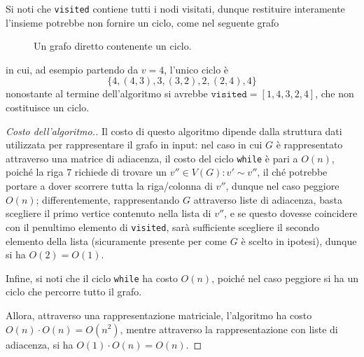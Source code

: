 \documentclass[a4paper, 12pt]{report}
\begin{document}
    \begin{framedobs}{}
        Si noti che \texttt{visited} contiene tutti i nodi visitati, dunque restituire interamente l'insieme potrebbe non fornire un ciclo, come nel seguente grafo
        \begin{figure}[H]
            \centering
            \caption{Un grafo diretto contenente un ciclo.}
        \end{figure}

        in cui, ad esempio partendo da $v= 4$, l'unico ciclo è $$\{4, (4, 3), 3, (3, 2), 2, (2, 4), 4\}$$ nonostante al termine dell'algoritmo si avrebbe $\texttt{visited}=[1, 4, 3, 2, 4]$, che non costituisce un ciclo.

    \end{framedobs}

    \begin{proof}[Costo dell'algoritmo.]
        Il costo di questo algoritmo dipende dalla struttura dati utilizzata per rappresentare il grafo in input: nel caso in cui $G$ è rappresentato attraverso una matrice di adiacenza, il costo del ciclo \texttt{while} è pari a $O(n)$, poiché la riga $7$ richiede di trovare un $v'' \in V(G) : v' \sim v''$, il ché potrebbe portare a dover scorrere tutta la riga/colonna di $v''$, dunque nel caso peggiore $O(n)$; differentemente, rappresentando $G$ attraverso liste di adiacenza, basta scegliere il primo vertice contenuto nella lista di $v''$, e se questo dovesse coincidere con il penultimo elemento di \texttt{visited}, sarà sufficiente scegliere il secondo elemento della lista (sicuramente presente per come $G$ è scelto in ipotesi), dunque si ha $O(2) = O(1)$.

        Infine, si noti che il ciclo \texttt{while} ha costo $O(n)$, poiché nel caso peggiore si ha un ciclo che percorre tutto il grafo.

        Allora, attraverso una rappresentazione matriciale, l'algoritmo ha costo $O(n) \cdot O(n) = O(n^2)$, mentre attraverso la rappresentazione con liste di adiacenza, si ha $O(1) \cdot O(n) = O(n)$.
    \end{proof}
\end{document}
